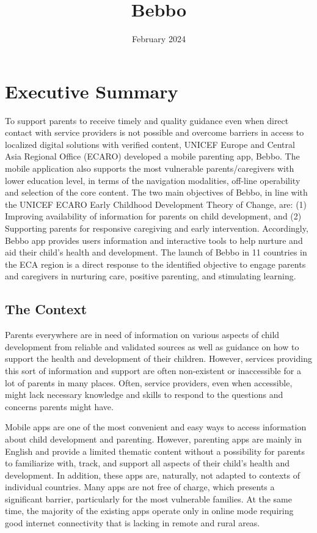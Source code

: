 \documentclass{article}
\title{Bebbo}
\date{February 2024}
\begin{document}
\maketitle

\tableofcontents

\clearpage
\section{Executive Summary}

To support parents to receive timely and quality guidance even when direct contact with service  providers is not possible and overcome barriers in access to localized digital solutions with verified  content, UNICEF Europe and Central Asia Regional Office (ECARO) developed a mobile parenting app,  Bebbo. The mobile application also supports the most vulnerable parents/caregivers with lower  education level, in terms of the navigation modalities, off-line operability and selection of the core  content. The two main objectives of Bebbo, in line with the UNICEF ECARO Early Childhood  Development Theory of Change, are: (1) Improving availability of information for parents on child  development, and (2) Supporting parents for responsive caregiving and early intervention.  Accordingly, Bebbo app provides users information and interactive tools to help nurture and aid their  child’s health and development. The launch of Bebbo in 11 countries in the ECA region is a direct  response to the identified objective to engage parents and caregivers in nurturing care, positive  parenting, and stimulating learning.

\subsection*{The Context}
Parents everywhere are in need of information on various aspects of child development from reliable  and validated sources as well as guidance on how to support the health and development of their  children. However, services providing this sort of information and support are often non-existent or  inaccessible for a lot of parents in many places. Often, service providers, even when accessible, might  lack necessary knowledge and skills to respond to the questions and concerns parents might have.

Mobile apps are one of the most convenient and easy ways to access information about child  development and parenting. However, parenting apps are mainly in English and provide a limited  thematic content without a possibility for parents to familiarize with, track, and support all aspects of  their child’s health and development. In addition, these apps are, naturally, not adapted to contexts of  individual countries. Many apps are not free of charge, which presents a significant barrier, particularly  for the most vulnerable families. At the same time, the majority of the existing apps operate only in  online mode requiring good internet connectivity that is lacking in remote and rural areas.
\end{document}
